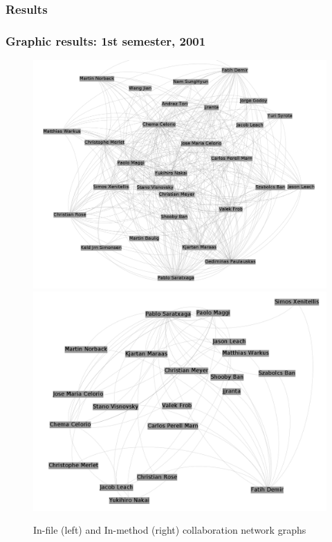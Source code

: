 \documentclass{beamer}
\begin{document}
\subsubsection{Results}

\begin{frame}
\frametitle{Graphic results: 1st semester, 2001}
\begin{figure}[h!]
\begin{center}
\includegraphics[scale=0.12]{g2001files.png} 
\includegraphics[scale=0.12]{g2001methods.png}
\caption{In-file (left) and In-method (right) collaboration network graphs}
\label{fig:2001}
\end{center}
\end{figure}
\end{frame}
\end{document}
